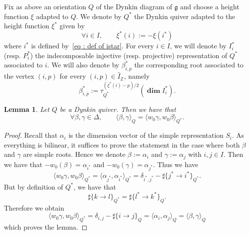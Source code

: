\documentclass[12pt]{amsart}
\theoremstyle{plain}
\newtheorem{lemma}[theorem]{Lemma}
\theoremstyle{definition}
\numberwithin{equation}{section}
\newcommand{\IZ}{\widehat{I}_{\mathbb{Z}}}
\DeclareMathOperator*{\dimvec}{\mathbf{dim}}
\begin{document}
 Fix as above an orientation $Q$ of the Dynkin diagram of $\mathfrak{g}$ and choose a height function $\xi$ adapted to $Q$. We denote by $Q^{*}$ the Dynkin quiver adapted to the height function $\xi^{*}$ given by 
\begin{equation} \label{eq : def of xistar}
 \forall i \in I , \qquad  \xi^{*}(i) := - \xi(i^{*})  
 \end{equation}
 where $i^{*}$ is defined by~\eqref{eq : def of istar}.
For every $i \in I$, we will denote by $I_i^{*}$ (resp. $P_i^{*}$) the indecomposable injective (resp. projective) representation of $Q^{*}$ associated to $i$. We will also denote by $\beta_{i,p}^{*}$ the corresponding root associated to the vertex $(i,p)$ for every $(i,p) \in \IZ$, namely 
  $$ \beta_{i,p}^{*} := \tau_{Q^{*}}^{(\xi^{*}(i)-p)/2} \left(  \dimvec I_i^{*} \right). $$

 \begin{lemma} \label{lem : Euler forms}
 Let $Q$ be a Dynkin quiver. Then  we have that 
 $$ \forall \beta , \gamma \in  \Delta, \qquad  \langle  \beta , \gamma \rangle_Q = \langle  w_0 \gamma , w_0 \beta  \rangle_{Q^{*}} .  $$
  \end{lemma}

\begin{proof}
Recall that \(\alpha_{i}\) is the dimension vector of the simple representation \(S_{i}\).
As everything is bilinear, it suffices to prove the statement in the case where both $\beta$ and $\gamma$ are simple roots. Hence we denote $\beta := \alpha_i$ and $\gamma := \alpha_j$ with $i,j \in I$. Then we have that $-w_0(\beta) = \alpha_{i^{*}}$ and $-w_0(\gamma)=\alpha_{j^{*}}$. Thus we have 
$$  \langle  w_0 \gamma , w_0 \beta  \rangle_{Q^{*}}  = \langle  \alpha_{j^{*}} , \alpha_{i^{*}} \rangle_{Q^{*}}  = \delta_{i^{*} , j^{*}} -  \sharp \{ j^{*} \rightarrow i^{*} \}_{Q^{*}}  . $$
But by definition of $Q^{*}$, we have that 
$$  \sharp \{  k \rightarrow l \}_{Q^{*}}  =  \sharp \{  l^{*} \rightarrow k^{*} \}_Q . $$
Therefore we obtain 
$$  \langle  w_0 \gamma , w_0 \beta  \rangle_{Q^{*}}  = \delta_{i,j} -  \sharp \{ i \rightarrow j \}_{Q}   = \langle \alpha_i , \alpha_j \rangle_Q = \langle \beta , \gamma \rangle_Q  $$
which proves the lemma.
\end{proof}
\end{document}
